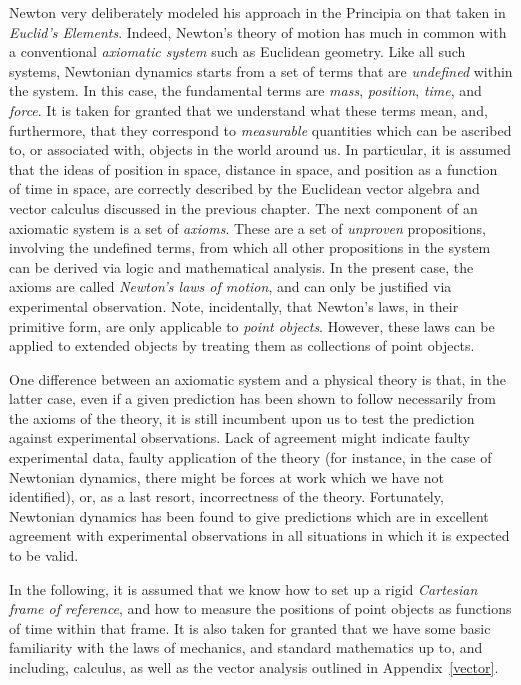  Newton very deliberately modeled his approach in the Principia on
that taken in {\em Euclid's Elements}.
Indeed, Newton's theory of motion has much in common with a conventional {\em axiomatic system}\/ such  as Euclidean geometry. Like all such  systems, Newtonian dynamics starts from a set of terms that are {\em undefined}\/ within the
system. In  this case, the fundamental terms are {\em mass}, {\em position}, 
{\em time}, and {\em force}. It is taken for granted that  we understand what these terms mean,
and, furthermore, that they correspond to {\em measurable}\/ quantities which
can be ascribed to, or associated with, objects in the world
around us. In particular, it is assumed that the ideas of position
in space, distance in space, and position as a function of time in space, are
correctly described by the Euclidean vector algebra and vector calculus discussed in the
previous chapter.
The next component
of an axiomatic system is a set of {\em axioms}. These are a set of
{\em unproven}\/ propositions, involving the undefined terms, from which
all other propositions in the system can be derived via logic and mathematical
analysis. In the present case, the axioms are called {\em Newton's laws of
motion}, and can only be justified via experimental observation.
Note, incidentally, that Newton's laws, in their primitive form, are only applicable
to {\em point objects}. However, these laws can
be applied to extended objects by treating them as collections of point
objects.

One difference between an axiomatic system and a physical theory is that,
in the latter case, even if a given prediction has been shown to follow
necessarily from the axioms of the theory, it is still incumbent upon us to test the prediction against
experimental observations. Lack of agreement might indicate
faulty experimental data, faulty application of the theory (for instance, in the case of Newtonian dynamics, there
might be forces at work which we have not identified), or, as a last resort, 
incorrectness of the theory. Fortunately, 
Newtonian dynamics has been found to give predictions which are in excellent agreement with experimental
observations in all
situations in which  it is expected to be valid.

In the following, it is assumed that we know how to set up a rigid {\em Cartesian
frame of reference}, and how to measure the positions of point objects as 
functions of time within that frame. It is also taken for granted that we  have some basic
familiarity with the laws of mechanics, and standard mathematics up to, and including, calculus, as well
as
the vector analysis outlined in Appendix~\ref{vector}.


